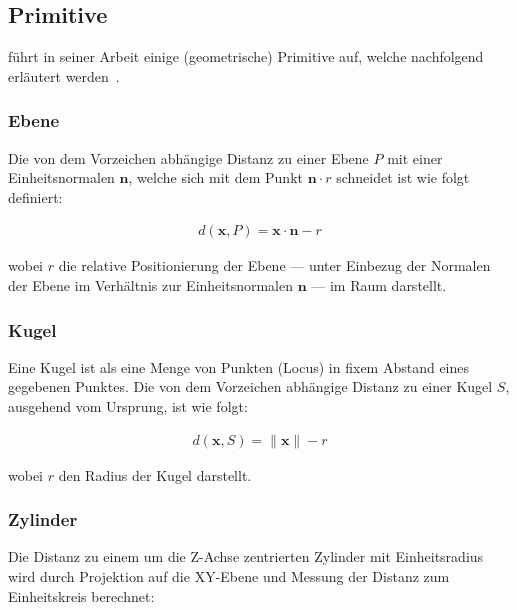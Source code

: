 \subsection{Primitive}
\label{subsec:implicit_surfaces_primitives}

\citeauthor{hart_sphere_1994} führt in seiner Arbeit einige
(geometrische) Primitive auf, welche nachfolgend erläutert
werden~\parencite[S. 540ff]{hart_sphere_1994}.

\subsubsection{Ebene}
\label{ssubsec:implicit_surfaces_primitives_plane}

Die von dem Vorzeichen abhängige Distanz zu einer Ebene $P$ mit einer
Einheitsnormalen $\bm{n}$, welche sich mit dem Punkt $\bm{n} \cdot r$
schneidet ist wie folgt definiert:

\begin{gather}
    d(\bm{x}, P) = \bm{x} \cdot \bm{n} - r
\end{gather}

wobei $r$ die relative Positionierung der Ebene --- unter Einbezug der
Normalen der Ebene im Verhältnis zur Einheitsnormalen $\bm{n}$ --- im
Raum darstellt.

\subsubsection{Kugel}
\label{ssubsec:implicit_surfaces_primitives_sphere}

Eine Kugel ist als eine Menge von Punkten (Locus) in fixem Abstand eines
gegebenen Punktes. Die von dem Vorzeichen abhängige Distanz zu einer
Kugel $S$, ausgehend vom Ursprung, ist wie folgt:

\begin{gather}
    d(\bm{x}, S) = \|\bm{x}\| - r
\end{gather}

wobei $r$ den Radius der Kugel darstellt.

\subsubsection{Zylinder}
\label{ssubsec:implicit_surfaces_primitives_cylinder}

Die Distanz zu einem um die Z-Achse zentrierten Zylinder mit
Einheitsradius wird durch Projektion auf die XY-Ebene und Messung der
Distanz zum Einheitskreis berechnet:

